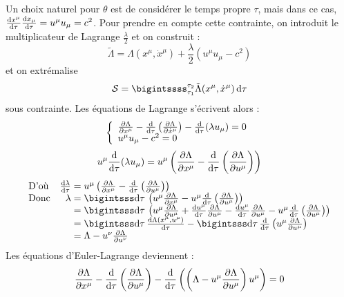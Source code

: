 {\txt Un choix naturel pour $\theta$ est de considérer le temps propre $\tau$, mais dans ce cas, $\frac{\mathrm{d} x^\mu}{\mathrm{d}\tau}\frac{\mathrm{d} x_\mu}{\mathrm{d}\tau}=u^\mu u_\mu=c^2$. Pour prendre en compte cette contrainte, on introduit le multiplicateur de Lagrange $\frac{\lambda}{2}$ et on construit :}
$$
	\tilde{\Lambda}=\Lambda(x^\mu,\dot{x}^\mu)+\frac{\lambda}{2}(u^\mu u_\mu-c^2)
$$
et on extrémalise 
$$
	\mathcal{S}=\bigintssss_{\tau_1}^{\tau_2} \tilde{\Lambda}(x^\mu,\dot{x}^\mu)\,\dif\tau
$$
sous contrainte. Les équations de Lagrange s'écrivent alors :
$$
	\left\{ \begin{array}{l}
		\frac{\partial\Lambda}{\partial x^\mu}-\frac{\mathrm{d}}{\mathrm{d}\tau}\left(\frac{\partial \Lambda}{\partial\dot{x}^\mu}\right)-\frac{\mathrm{d}}{\mathrm{d}\tau}(\lambda u_\mu)=0	\\
		u^\mu u_\mu-c^2=0
	\end{array} \right.
$$
$$
	u^\mu \frac{\mathrm{d}}{\mathrm{d}\tau}(\lambda u_\mu)=u^\mu\left(\frac{\partial\Lambda}{\partial x^\mu}-\frac{\mathrm{d}}{\mathrm{d}\tau}\left(\frac{\partial \Lambda}{\partial u^\mu}\right)\right)
$$
$$
	\begin{array}{lr@{\;}l}
		\text{D'où}&\frac{\dif \lambda}{\dif\tau}&=u^\mu\left(\frac{\partial\Lambda}{\partial x^\mu}-\frac{\dif}{\dif\tau}\left(\frac{\partial \Lambda}{\partial u^\mu}\right)\right)\\
		\text{Donc}&\lambda &=\bigintsss\dif\tau\,\left( u^\mu \frac{\partial\Lambda}{\partial x^\mu}-u^\mu \frac{\dif}{\dif\tau}\left(\frac{\partial \Lambda}{\partial u^\mu}\right)\right)\\
		&&=\bigintsss\dif\tau\,\left(u^\mu \frac{\partial \Lambda}{\partial u^\mu}+ \frac{\dif u^\mu}{\dif\tau}\frac{\partial\Lambda}{\partial u^\mu}-\frac{\dif u^\mu}{\dif\tau}\frac{\partial\Lambda}{\partial u^\mu}-u^\mu \frac{\dif}{\dif\tau}\left(\frac{\partial \Lambda}{\partial u^\mu}\right) \right)\\
		&&=\bigintsss\dif\tau\,\frac{\dif\Lambda(x^\mu ,u^\mu)}{\dif\tau} - \bigintsss\dif\tau\,\frac{\dif}{\dif\tau}\left(u^\mu\frac{\partial \Lambda}{\partial u^\mu} \right) \\
		&&=\Lambda-u^\nu\frac{\partial \Lambda}{\partial u^\nu}
	\end{array}
$$
Les équations d'Euler-Lagrange deviennent :  
$$
	\frac{\partial\Lambda}{\partial x^\mu}-\frac{\mathrm{d}}{\mathrm{d}\tau}\left(\frac{\partial \Lambda}{\partial u^\mu}\right)-\frac{\mathrm{d}}{\mathrm{d}\tau}\left(\left(\Lambda-u^\mu\frac{\partial\Lambda}{\partial u^\mu}\right) u^\mu\right)=0
$$


